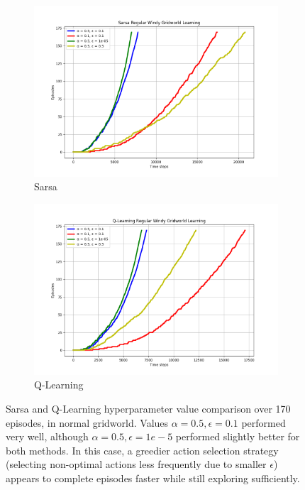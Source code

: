 \documentclass{article}
\begin{document}
\begin{figure}[h!]
  \centering
  \begin{subfigure}{0.45\textwidth} 
    \includegraphics[width=\textwidth]{sarsa_regular.png}
    \caption{Sarsa}
  \end{subfigure}
  \hspace{0.05\textwidth}  
  \begin{subfigure}{0.45\textwidth}  
    \includegraphics[width=\textwidth]{q_regular.png}
    \caption{Q-Learning}
  \end{subfigure}
  \caption{Sarsa and Q-Learning hyperparameter value comparison over 170 episodes, in normal gridworld. Values $\alpha = 0.5, \epsilon = 0.1$ performed very well, although $\alpha = 0.5, \epsilon = 1e-5$ performed slightly better for both methods. In this case, a greedier action selection strategy (selecting non-optimal actions less frequently due to smaller $\epsilon$) appears to complete episodes faster while still exploring sufficiently.}
  \label{fig:hyperparam}
\end{figure}
\end{document}
